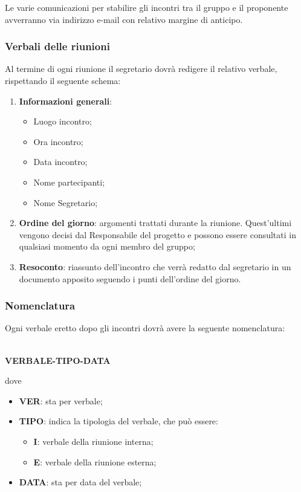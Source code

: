 Le varie comunicazioni per stabilire gli incontri tra il gruppo e il proponente avverranno via indirizzo e-mail con relativo margine di anticipo.
\subsubsection{Verbali delle riunioni}
Al termine di ogni riunione il segretario dovrà redigere il relativo verbale, rispettando il seguente
schema:
\begin{enumerate}
	\item \textbf{Informazioni generali}:
		\begin{itemize}
			\item Luogo incontro;
			\item Ora incontro;
			\item Data incontro;
			\item Nome partecipanti;
			\item Nome Segretario;
		\end{itemize}
	\item \textbf{Ordine del giorno}: argomenti trattati durante la riunione. Quest’ultimi vengono decisi dal Responsabile del progetto e possono essere consultati in qualsiasi momento da ogni membro del gruppo;
	\item \textbf{Resoconto}: riassunto dell’incontro che verrà redatto dal segretario in un documento apposito seguendo i punti dell’ordine del giorno.
\end{enumerate}
\subsubsection{Nomenclatura}
Ogni verbale eretto dopo gli incontri dovrà avere la seguente nomenclatura:\\ \\
\centerline {\textbf{VERBALE-TIPO-DATA}}
dove \\
\begin{itemize}
\item \textbf{VER}: sta per verbale;
\item \textbf{TIPO}: indica la tipologia del verbale, che può essere:
	\begin{itemize}
  		\item \textbf{I}: verbale della riunione interna;
 		 \item \textbf{E}: verbale della riunione esterna;
	\end{itemize}
\item \textbf{DATA}: sta per data del verbale;
\end{itemize}

